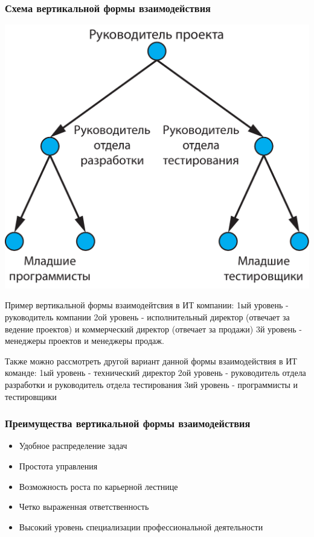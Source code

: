 \documentclass{../industrial-development}
\begin{document}
\begin{frame} \frametitle{Схема вертикальной формы взаимодействия}
	\begin{block}{}
		\centerline{\includegraphics[height=0.7\textheight]{vertical.pdf}}
	\end{block}
\end{frame}

\lecturenotes
Пример вертикальной формы взаимодейтсвия в ИТ компании:
1ый уровень - руководитель компании
2ой уровень - исполнительный директор (отвечает за ведение проектов) и коммерческий директор (отвечает за продажи)
3й уровень - менеджеры проектов и менеджеры продаж.

Также можно рассмотреть другой вариант данной формы взаимодействия в ИТ команде:
1ый уровень -  технический директор
2ой уровень -  руководитель отдела разработки и руководитель отдела тестирования
3ий уровень - программисты и тестировщики


\begin{frame} \frametitle{Преимущества вертикальной формы взаимодействия}

  
  \begin{itemize}
  \item Удобное распределение задач
  \item Простота управления
  \item Возможность роста по карьерной лестнице
  \item Четко выраженная ответственность
  \item Высокий уровень специализации профессиональной деятельности

  \end{itemize}
\end{frame}
\end{document}
